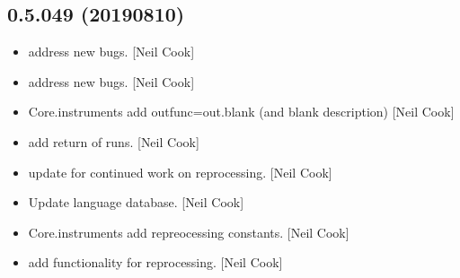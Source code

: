 \documentclass[a4paper,10pt,english]{report}
\begin{document}
\subsection{0.5.049 (2019\sphinxhyphen{}08\sphinxhyphen{}10)}
\label{\detokenize{misc/changelog:id113}}\begin{itemize}
\item {} 
 \sphinxhyphen{} address new bugs. {[}Neil Cook{]}

\item {} 
 \sphinxhyphen{} address new bugs. {[}Neil Cook{]}

\item {} 
Core.instruments \sphinxhyphen{} add outfunc=out.blank (and blank description) {[}Neil
Cook{]}

\item {} 
 \sphinxhyphen{} add return of runs. {[}Neil Cook{]}

\item {} 
 \sphinxhyphen{} update for continued work on reprocessing. {[}Neil
Cook{]}

\item {} 
Update language database. {[}Neil Cook{]}

\item {} 
Core.instruments \sphinxhyphen{} add repreocessing constants. {[}Neil Cook{]}

\item {} 
 \sphinxhyphen{} add functionality for reprocessing. {[}Neil Cook{]}

\end{itemize}
\end{document}
